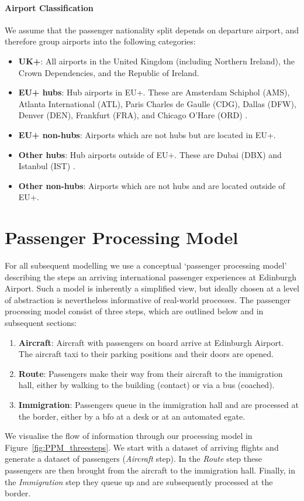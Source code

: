 \documentclass[10pt]{article}
\begin{document}
\paragraph{Airport Classification}
We assume that the passenger nationality split depends on departure airport, and therefore group airports into the following categories: 
\begin{itemize}
    \item \textbf{UK+}: All airports in the United Kingdom (including Northern Ireland), the Crown Dependencies, and the Republic of Ireland.
    \item \textbf{EU+ hubs}: Hub airports in EU+. These are Amsterdam Schiphol (AMS), Atlanta International (ATL), Paris Charles de Gaulle (CDG), Dallas (DFW), Denver (DEN), Frankfurt (FRA), and Chicago O'Hare (ORD) \cite{mega_hubs}.
    \item \textbf{EU+ non-hubs}: Airports which are not hubs but are located in EU+.
    \item \textbf{Other hubs}: Hub airports outside of EU+. These are Dubai (DBX) and Istanbul (IST) \cite{mega_hubs}.
    \item \textbf{Other non-hubs}: Airports which are not hubs and are located outside of EU+.
\end{itemize}




\section{Passenger Processing Model}

    For all subsequent modelling we use a conceptual `passenger processing model' describing the steps an arriving international passenger experiences at Edinburgh Airport. Such a model is inherently a simplified view, but ideally chosen at a level of abstraction is nevertheless informative of real-world processes. The passenger processing model consist of three steps, which are outlined below and in subsequent sections:
\begin{enumerate}
    \item \textbf{Aircraft}: Aircraft with passengers on board arrive at Edinburgh Airport. The aircraft taxi to their parking positions and their doors are opened. \label{step:aircraft}
    \item \textbf{Route}: Passengers make their way from their aircraft to the immigration hall, either by walking to the building (contact) or via a bus (coached). \label{step:route}
    \item \textbf{Immigration}: Passengers queue in the immigration hall and are processed at the border, either by a \gls{bfo} at a desk or at an automated \gls{egate}. \label{step:immigration}
\end{enumerate}
 We visualise the flow of information through our processing model in Figure~\ref{fig:PPM_threesteps}. We start with a dataset of arriving flights and generate a dataset of passengers (\textit{Aircraft} step). In the \textit{Route} step these passengers are then brought from the aircraft to the immigration hall. Finally, in the \textit{Immigration} step they queue up and are subsequently processed at the border.
\end{document}
